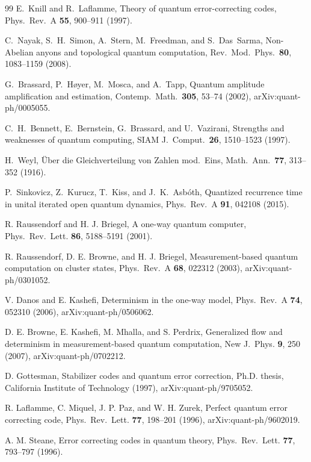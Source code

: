 \documentclass[aps,pra,onecolumn,superscriptaddress,nofootinbib,10pt]{revtex4-2}
\theoremstyle{definition}
\theoremstyle{remark}
\begin{document}
\begin{thebibliography}{99}
 E.~Knill and R.~Laflamme, Theory of quantum error-correcting codes, Phys.\ Rev.\ A \textbf{55}, 900--911 (1997).

 C.~Nayak, S.~H.~Simon, A.~Stern, M.~Freedman, and S.~Das~Sarma, Non-Abelian anyons and topological quantum computation, Rev.\ Mod.\ Phys.\ \textbf{80}, 1083--1159 (2008).

 G.~Brassard, P.~H{\o}yer, M.~Mosca, and A.~Tapp, Quantum amplitude amplification and estimation, Contemp.\ Math.\ \textbf{305}, 53--74 (2002), arXiv:quant-ph/0005055.

 C.~H.~Bennett, E.~Bernstein, G.~Brassard, and U.~Vazirani, Strengths and weaknesses of quantum computing, SIAM J.\ Comput.\ \textbf{26}, 1510--1523 (1997).

 H.~Weyl, \"Uber die Gleichverteilung von Zahlen mod.\ Eins, Math.\ Ann.\ \textbf{77}, 313--352 (1916).

 P.~Sinkovicz, Z.~Kurucz, T.~Kiss, and J.~K.~Asb\'oth, Quantized recurrence time in unital iterated open quantum dynamics, Phys.\ Rev.\ A \textbf{91}, 042108 (2015).

 R. Raussendorf and H. J. Briegel, A one-way quantum computer, Phys.\ Rev.\ Lett. \textbf{86}, 5188--5191 (2001).

 R. Raussendorf, D. E. Browne, and H. J. Briegel, Measurement-based quantum computation on cluster states, Phys.\ Rev.\ A \textbf{68}, 022312 (2003), arXiv:quant-ph/0301052.

 V. Danos and E. Kashefi, Determinism in the one-way model, Phys.\ Rev.\ A \textbf{74}, 052310 (2006), arXiv:quant-ph/0506062.

 D. E. Browne, E. Kashefi, M. Mhalla, and S. Perdrix, Generalized flow and determinism in measurement-based quantum computation, New J.\ Phys. \textbf{9}, 250 (2007), arXiv:quant-ph/0702212.

 D. Gottesman, Stabilizer codes and quantum error correction, Ph.D. thesis, California Institute of Technology (1997), arXiv:quant-ph/9705052.

 R. Laflamme, C. Miquel, J. P. Paz, and W. H. Zurek, Perfect quantum error correcting code, Phys.\ Rev.\ Lett. \textbf{77}, 198--201 (1996), arXiv:quant-ph/9602019.

 A. M. Steane, Error correcting codes in quantum theory, Phys.\ Rev.\ Lett. \textbf{77}, 793--797 (1996).


\end{thebibliography}
\end{document}
